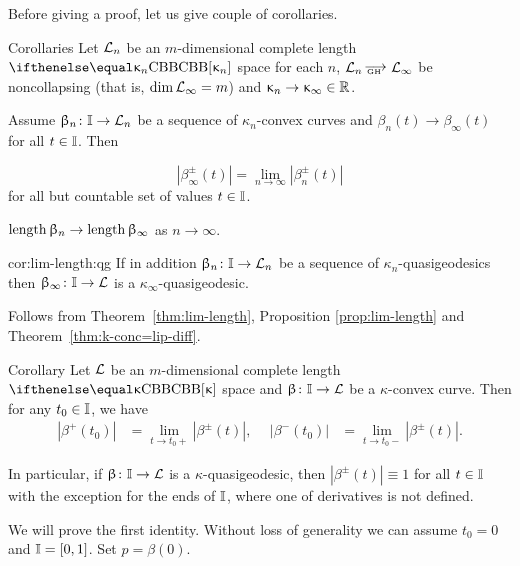 Before giving a proof, let us give couple of corollaries. 

\begin{thm}{Corollaries}\label{cor:lim-length}
Let 
$\mathcal{L}_n$ be an $m$-dimensional complete length $\Alex{\kappa_n}$ space for each $n$, 
$\spc{L}_n\GHto \spc{L}_\infty$  be noncollapsing (that is, $\mathop{\rm dim}\nolimits\mathcal{L}_\infty=m$)
and $\kappa_n\to\kappa_\infty\in\RR$.

Assume $\beta_n\:\II\to \spc{L}_n$ be a sequence of $\kappa_n$-convex curves
and $\beta_n(t)\to \beta_\infty(t)$ for all $t\in\II$.
Then
\begin{subthm}{}
\[|\beta_\infty^\pm(t)|
=
\lim_{n\to\infty}|\beta_n^\pm(t)|\]
for all but countable set of values $t\in\II$.
\end{subthm}

\begin{subthm}{}
$\length\beta_n\to\length\beta_\infty$ as $n\to\infty$.
\end{subthm}

\begin{subthm}{cor:lim-length:qg}
If in addition $\beta_n\:\II\to \spc{L}_n$ be a sequence of $\kappa_n$-quasigeodesics
then $\beta_\infty\:\II\to \spc{L}$ is a $\kappa_\infty$-quasigeodesic.
\end{subthm}
\end{thm}

Follows from Theorem~\ref{thm:lim-length},
Proposition \ref{prop:lim-length} 
and Theorem~\ref{thm:k-conc=lip-diff}.
\qeds

\begin{thm}{Corollary}\label{cor:one-side-cont}\label{cor:|gamma'|=1}
Let $\mathcal{L}$ be an $m$-dimensional complete length $\Alex{\kappa}$ space
and $\beta\:\II\to \spc{L}$ be a $\kappa$-convex curve.
Then for any $t_0\in \II$, we have
\begin{align*}
|\beta^+(t_0)| &= \lim_{t\to t_0+}|\beta^\pm(t)|,\ \ &|\beta^-(t_0)| &= \lim_{t\to t_0-}|\beta^\pm(t)|.
\end{align*}

In particular, if $\beta\:\II\to \spc{L}$ is a $\kappa$-quasigeodesic, then $|\beta^\pm(t)|\equiv1$ for all $t\in \II$ 
with the exception for the ends of $\mathbb{I}$, 
where one of derivatives is not defined.
\end{thm}

We will prove the first identity.
Without loss of generality we can assume $t_0=0$ and $\mathbb{I}=[0,1]$.
Set $p=\beta(0)$.

